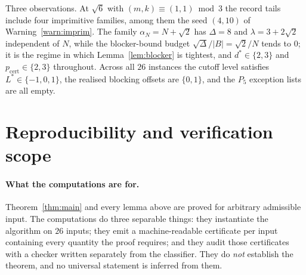 \documentclass[11pt]{article}
\theoremstyle{definition}
\theoremstyle{remark}
\begin{document}
Three observations. At $\sqrt6$ with $(m,k)\equiv(1,1)\bmod3$ the record tails include four
imprimitive families, among them the seed $(4,10)$ of Warning~\ref{warn:imprim}. The family
$\alpha_N=N+\sqrt2$ has $\Delta=8$ and $\lambda=3+2\sqrt2$ independent of $N$, while the
blocker-bound budget $\sqrt\Delta/|B|=\sqrt2/N$ tends to $0$; it is the regime in which
Lemma~\ref{lem:blocker} is tightest, and $d^{*}\in\{2,3\}$ and $p_{\mathrm{cert}}\in\{2,3\}$
throughout. Across all $26$ instances the cutoff level satisfies $L^{*}\in\{-1,0,1\}$, the
realised blocking offsets are $\{0,1\}$, and the $P_5$ exception lists are all empty.

\section{Reproducibility and verification scope}\label{sec:repro}

\paragraph{What the computations are for.}
Theorem~\ref{thm:main} and every lemma above are proved for arbitrary admissible input. The
computations do three separable things: they instantiate the algorithm on $26$ inputs; they emit
a machine-readable certificate per input containing every quantity the proof requires; and they
audit those certificates with a checker written separately from the classifier. They do
\emph{not} establish the theorem, and no universal statement is inferred from them.
\end{document}
